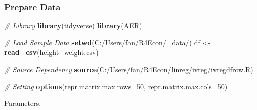 \documentclass[
]{book}
\newenvironment{Shaded}{\begin{snugshade}}{\end{snugshade}}
\newcommand{\CommentTok}[1]{\textcolor[rgb]{0.56,0.35,0.01}{\textit{#1}}}
\newcommand{\DataTypeTok}[1]{\textcolor[rgb]{0.13,0.29,0.53}{#1}}
\newcommand{\DecValTok}[1]{\textcolor[rgb]{0.00,0.00,0.81}{#1}}
\newcommand{\KeywordTok}[1]{\textcolor[rgb]{0.13,0.29,0.53}{\textbf{#1}}}
\newcommand{\NormalTok}[1]{#1}
\newcommand{\StringTok}[1]{\textcolor[rgb]{0.31,0.60,0.02}{#1}}
\begin{document}
\hypertarget{prepare-data}{%
\subsubsection{Prepare Data}\label{prepare-data}}

\begin{Shaded}
\begin{Highlighting}[]
\CommentTok{\# Library}
\KeywordTok{library}\NormalTok{(tidyverse)}
\KeywordTok{library}\NormalTok{(AER)}

\CommentTok{\# Load Sample Data}
\KeywordTok{setwd}\NormalTok{(}\StringTok{\textquotesingle{}C:/Users/fan/R4Econ/\_data/\textquotesingle{}}\NormalTok{)}
\NormalTok{df \textless{}{-}}\StringTok{ }\KeywordTok{read\_csv}\NormalTok{(}\StringTok{\textquotesingle{}height\_weight.csv\textquotesingle{}}\NormalTok{)}

\CommentTok{\# Source Dependency}
\KeywordTok{source}\NormalTok{(}\StringTok{\textquotesingle{}C:/Users/fan/R4Econ/linreg/ivreg/ivregdfrow.R\textquotesingle{}}\NormalTok{)}

\CommentTok{\# Setting}
\KeywordTok{options}\NormalTok{(}\DataTypeTok{repr.matrix.max.rows=}\DecValTok{50}\NormalTok{, }\DataTypeTok{repr.matrix.max.cols=}\DecValTok{50}\NormalTok{)}
\end{Highlighting}
\end{Shaded}

Parameters.
\end{document}
